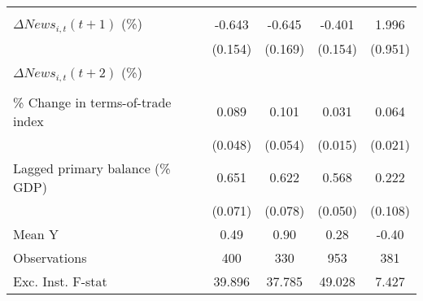 {\begin{tabular}{l*{4}{c}}
                    &                     &                     &                     &                     \\
\addlinespace
$ \Delta News_{i,t}(t+1)$ (\%)&      -0.643\sym{***}&      -0.645\sym{***}&      -0.401\sym{***}&       1.996\sym{**} \\
                    &     (0.154)         &     (0.169)         &     (0.154)         &     (0.951)         \\
\addlinespace
$ \Delta News_{i,t}(t+2)$ (\%)&                     &                     &                     &                     \\
                    &                     &                     &                     &                     \\
\addlinespace
\% Change in terms-of-trade index&       0.089\sym{*}  &       0.101\sym{*}  &       0.031\sym{**} &       0.064\sym{***}\\
                    &     (0.048)         &     (0.054)         &     (0.015)         &     (0.021)         \\
\addlinespace
Lagged primary balance (\% GDP)&       0.651\sym{***}&       0.622\sym{***}&       0.568\sym{***}&       0.222\sym{**} \\
                    &     (0.071)         &     (0.078)         &     (0.050)         &     (0.108)         \\
\midrule
Mean Y              &        0.49         &        0.90         &        0.28         &       -0.40         \\
Observations        &         400         &         330         &         953         &         381         \\
Exc. Inst. F-stat   &      39.896         &      37.785         &      49.028         &       7.427         \\
\bottomrule
\end{tabular}
}
